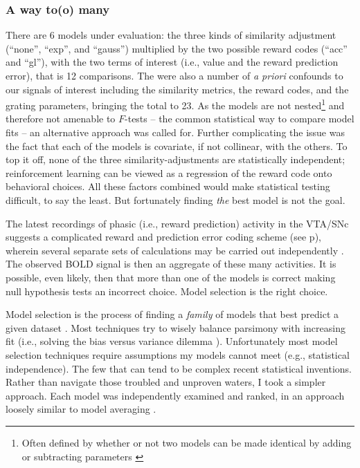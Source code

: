 \subsubsection{A way to(o) many}
\label{subsub:tomany}
There are 6 models under evaluation: the three kinds of similarity adjustment (``none'', ``exp'', and ``gauss'') multiplied by the two possible reward codes (``acc'' and ``gl''), with the two terms of interest (i.e., value and the reward prediction error), that is 12 comparisons.  The were also a number of \emph{a priori} confounds to our signals of interest including the similarity metrics, the reward codes, and the grating parameters, bringing the total to 23.  As the models are not nested\footnote{
    Often defined by whether or not two models can be made identical by adding or subtracting parameters \cite{Forster:2000p9623}} and therefore not amenable to $F$-tests -- the common statistical way to compare model fits -- an alternative approach was called for.  Further complicating the issue was the fact that each of the models is covariate, if not collinear, with the others.  To top it off, none of the three similarity-adjustments are statistically independent; reinforcement learning can be viewed as a regression of the reward code onto behavioral choices.  All these factors combined would make statistical testing difficult, to say the least.  But fortunately finding \emph{the} best model is not the goal.  

The latest recordings of phasic (i.e., reward prediction) activity in the VTA/SNc suggests a complicated reward and prediction error coding scheme (see p\pageref{subsub:expectations}), wherein several separate sets of calculations may be carried out independently \cite{Kim:2006p1063, Matsumoto:2009p7219, Smith:2011p8133}.  The observed BOLD signal is then an aggregate of these many activities. It is possible, even likely, then that more than one of the models is correct making null hypothesis tests an incorrect choice.  Model selection is the right choice.

Model selection is the process of finding a \emph{family} of models that best predict a given dataset \cite{Rao:2001p9457}.  Most techniques try to wisely balance parsimony with increasing fit (i.e., solving the bias versus variance dilemma \cite{Geman:1p9469}).  Unfortunately most model selection techniques require assumptions my models cannot meet (e.g., statistical independence).  The few that can tend to be complex recent statistical inventions.  Rather than navigate those troubled and unproven waters, I took a simpler approach. Each model was independently examined and ranked, in an approach loosely similar to model averaging \cite{Forster:2000p9623}.

